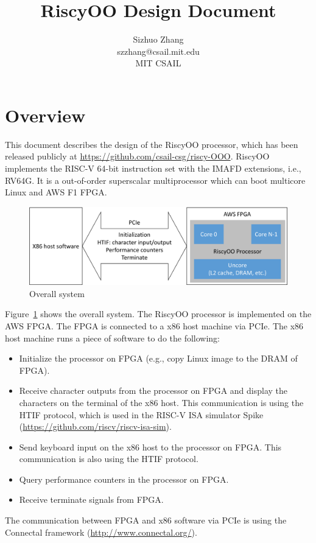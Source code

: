 \documentclass[12pt]{article}
\begin{document}
\title{RiscyOO Design Document}
\author{Sizhuo Zhang \\ szzhang@csail.mit.edu \\ MIT CSAIL}
\date{}
\maketitle

\section{Overview}

This document describes the design of the RiscyOO processor, which has been released publicly at \url{https://github.com/csail-csg/riscy-OOO}.
RiscyOO implements the RISC-V 64-bit instruction set with the IMAFD extensions, i.e., RV64G.
It is a out-of-order superscalar multiprocessor which can boot multicore Linux and AWS F1 FPGA.

\begin{figure}[!htb]
    \centering
    \includegraphics[width=\columnwidth]{fig/system_crop.pdf}
    \caption{Overall system}\label{fig:sys}
\end{figure}

Figure~\ref{fig:sys} shows the overall system.
The RiscyOO processor is implemented on the AWS FPGA.
The FPGA is connected to a x86 host machine via PCIe.
The x86 host machine runs a piece of software to do the following:
\begin{itemize}
    \item Initialize the processor on FPGA (e.g., copy Linux image to the DRAM of FPGA).
    \item Receive character outputs from the processor on FPGA and display the characters on the terminal of the x86 host.
    This communication is using the HTIF protocol, which is used in the RISC-V ISA simulator Spike (\url{https://github.com/riscv/riscv-isa-sim}).
    \item Send keyboard input on the x86 host to the processor on FPGA.
    This communication is also using the HTIF protocol.
    \item Query performance counters in the processor on FPGA.
    \item Receive terminate signals from FPGA.
\end{itemize}
The communication between FPGA and x86 software via PCIe is using the Connectal framework (\url{http://www.connectal.org/}).
\end{document}
